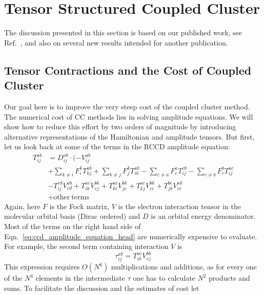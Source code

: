 \chapter{Tensor Structured Coupled Cluster
\label{ch:tcc}} 
The discussion presented in this section is based on our published work, see 
Ref.~\cite{schutski2017tensor}, and also on several new results intended for 
another publication.

\section{Tensor Contractions and the Cost of Coupled Cluster}
Our goal here is to improve the very steep cost of the coupled 
cluster method. The numerical cost of CC methods lies in solving amplitude 
equations. We will show how to reduce this effort by two orders of 
magnitude by introducing alternative representations of the Hamiltonian 
and amplitude tensors. But first, let us look back at some of the terms in the 
RCCD amplitude equation:
%
\begin{equation}
\begin{split}
T^{ab}_{ij} & = D^{ab}_{ij} \cdot (- V^{ab}_{ij} \\
& + \sum_{k \neq i} F^{k}_{i} T^{ab}_{kj}
+  \sum_{k \neq j} F^{k}_{j}  T^{ab}_{ik}
- \sum_{c \neq a} F^{a}_{c}  T^{cb}_{ij}
- \sum_{c \neq b} F^{b}_{c}  T^{ac}_{ij} \\
& - T^{cd}_{ij}  V^{ab}_{cd}
+ T^{ac}_{ik}  V^{bk}_{cj} 
+ T^{ac}_{ki}  V^{bk}_{jc} 
+ T^{ac}_{kj}  V^{bk}_{ci} 
+ T^{bc}_{jk}  V^{ak}_{ci}\\
&+ \mathrm{other~terms}
\end{split}
\label{eq:ccd_amplitude_equation_head}
\end{equation}
%
Again, here $F$ is the Fock matrix, $V$ is the electron interaction tensor in 
the molecular orbital basis (Dirac ordered) and $D$ is an orbital energy 
denominator. Most of the terms on the right hand side of 
Eqn.~\ref{eq:ccd_amplitude_equation_head} are numerically expensive to 
evaluate. For example, the second term containing interaction 
$V$ is
%
\begin{equation}
 \tau^{ab}_{ij} = T^{ac}_{ik}  V^{bk}_{cj}
 \label{eq:ccd_intermediate_example}
\end{equation}
%
This expression requires $O(N^6)$ multiplications and additions, as for every 
one of the $N^4$ elements in the intermediate $\tau$ one has to calculate $N^2$ 
products and sums. To facilitate the discussion and the estimates of cost let 
